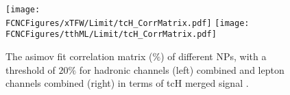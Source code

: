 
\begin{figure}[H]
\centering
\texttt{[image: \\FCNCFigures/xTFW/Limit/tcH\_CorrMatrix.pdf]}
\texttt{[image: \\FCNCFigures/tthML/Limit/tcH\_CorrMatrix.pdf]}
\caption{ The asimov fit correlation matrix ($\%$) of different NPs, with a threshold of $20\%$ for hadronic channels (left) combined and lepton channels combined (right) in terms of tcH merged signal . }
\label{fig:tcH_CorrMatrix}
\end{figure}

